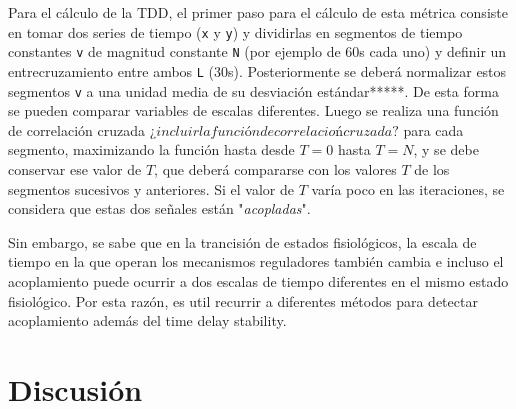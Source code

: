 \documentclass[twoside,twocolumn]{article}
\begin{document}
Para el cálculo de la TDD, el primer paso para el cálculo de esta métrica consiste en tomar dos series de tiempo (\texttt{x} y \texttt{y}) y dividirlas en segmentos de tiempo constantes \texttt{v} de magnitud constante \texttt{N} (por ejemplo de 60s cada uno) y definir un entrecruzamiento entre ambos \texttt{L} (30s).
Posteriormente se deberá normalizar estos segmentos \texttt{v} a una unidad media de su desviación estándar*****. De esta forma se pueden comparar variables de escalas diferentes.
Luego se realiza una función de correlación cruzada $¿incluir la función de correlacioń cruzada?$ para cada segmento, maximizando la función hasta desde $T = 0$ hasta $T = N$, y se debe conservar ese valor de $T$, que deberá compararse con los valores $T$ de los segmentos sucesivos y anteriores.
Si el valor de $T$ varía poco en las iteraciones, se considera que estas dos señales están "\textit{acopladas}".

Sin embargo, se sabe que en la trancisión de estados fisiológicos, la escala de tiempo en la que operan los mecanismos reguladores también cambia e incluso el acoplamiento puede ocurrir a dos escalas de tiempo diferentes en el mismo estado fisiológico\cite{bartsch2014coexisting}.
Por esta razón, es util recurrir a diferentes métodos para detectar acoplamiento además del time delay stability.


\section{Discusión}

\renewcommand\refname{Referencias}
\printbibliography
\end{document}
